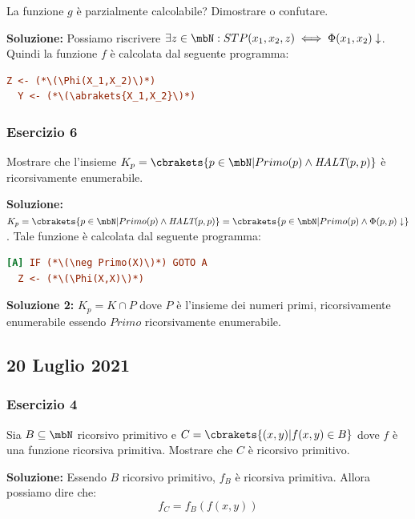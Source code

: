 La funzione \(g\) è parzialmente calcolabile? Dimostrare o confutare.

\textbf{Soluzione: } Possiamo riscrivere \(\exists z \in \mbN: STP(x_1,x_2,z) \iff \Phi(x_1,x_2)\downarrow\). Quindi la funzione \(f\) è calcolata dal seguente programma:

\begin{lstlisting}[language=ini, caption={ }]
  Z <- (*\(\Phi(X_1,X_2)\)*)
  Y <- (*\(\abrakets{X_1,X_2}\)*)
\end{lstlisting}


\subsubsection{Esercizio 6}

Mostrare che l'insieme \(K_p=\cbrakets{p \in \mbN \vert Primo(p) \land \textit{HALT}(p,p) }\) è ricorsivamente enumerabile.

\textbf{Soluzione: } \(K_p=\cbrakets{p \in \mbN \vert Primo(p) \land \textit{HALT}(p,p) }=\cbrakets{p \in \mbN \vert Primo(p) \land \Phi(p,p) \downarrow}\). Tale funzione è calcolata dal seguente programma:

\begin{lstlisting}[language=ini, caption={ }]
[A] IF (*\(\neg Primo(X)\)*) GOTO A
  Z <- (*\(\Phi(X,X)\)*)
\end{lstlisting}

\textbf{Soluzione 2: } \(K_p=K \cap P\) dove \(P\) è l'insieme dei numeri primi, ricorsivamente enumerabile essendo \(Primo\) ricorsivamente enumerabile.

\subsection{20 Luglio 2021}

\subsubsection{Esercizio 4}

Sia \(B\subseteq \mbN\) ricorsivo primitivo e \(C=\cbrakets{(x,y) \vert f(x,y) \in B}\) dove \(f\) è una funzione ricorsiva primitiva. Mostrare che \(C\) è ricorsivo primitivo.

\textbf{Soluzione: } Essendo \(B\) ricorsivo primitivo, \(f_B\) è ricorsiva primitiva. Allora possiamo dire che:
\begin{equation}
  f_C=f_B(f(x,y))
\end{equation}

